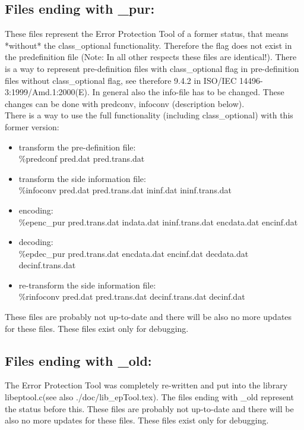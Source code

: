 \documentclass[a4paper]{article}
\begin{document}
\subsection{Files ending with \_pur: \label{_pur}}
These files represent the Error Protection Tool of a former status, that means *without* the class\_optional functionality. Therefore the flag does not exist in the predefinition file (Note: In all other respects these files are identical!). There is a way to represent pre-definition files with class\_optional flag in pre-definition files without class\_optional flag, see therefore 9.4.2 in ISO/IEC 14496-3:1999/Amd.1:2000(E). In general also the info-file has to be changed. These changes can be done with predconv, infoconv (description below).\\
There is a way to use the full functionality (including class\_optional)
with this former version:
\begin{itemize}
\item transform the pre-definition file: \\\%predconf pred.dat pred.trans.dat
\item transform the side information file: \\\%infoconv pred.dat pred.trans.dat ininf.dat ininf.trans.dat
\item encoding: \\\%epenc\_pur pred.trans.dat indata.dat ininf.trans.dat encdata.dat encinf.dat
\item decoding: \\\%epdec\_pur pred.trans.dat encdata.dat encinf.dat decdata.dat decinf.trans.dat
\item re-transform the side information file: \\\%rinfoconv pred.dat
  pred.trans.dat decinf.trans.dat decinf.dat
\end{itemize}
These files are probably not up-to-date and there will be also no more updates for these files. These files exist only for debugging.

\subsection{Files ending with \_old:}
The Error Protection Tool was completely re-written and put into the library libeptool.c(see also ./doc/lib\_epTool.tex). The files ending with \_old represent the status before this. These files are probably not up-to-date and there will be also no more updates for these files. These files exist only for debugging.
  
\end{document}
